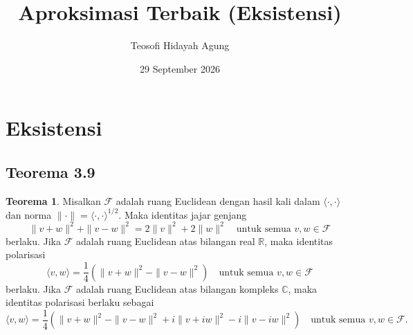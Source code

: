 \documentclass[aspectratio=169,11pt]{beamer}
\date{29 September 2026}
\title[Teori Aproksimasi]{Aproksimasi Terbaik (Eksistensi)}
\author[Tetew]{Teosofi Hidayah Agung}
\institute[Matematika ITS]{Matematika ITS}
\theoremstyle{definition}
\newtheorem{teorema}{Teorema}
\newcommand{\R}{\mathbb{R}}
\newcommand{\C}{\mathbb{C}}
\begin{document}
\begin{frame}
  \titlepage
\end{frame}

\section{Eksistensi}
\subsection{Teorema 3.9}

\begin{frame}{\insertsection}{\insertsubsection}
  \setcounter{teorema}{8}
  \begin{teorema}
    Misalkan $\mathcal{F}$ adalah ruang Euclidean dengan hasil kali dalam $\langle \cdot, \cdot \rangle$ dan norma $\| \cdot \| = \langle \cdot, \cdot \rangle^{1/2}$. Maka identitas jajar genjang
    \begin{equation}
      \|v+w\|^2 + \|v-w\|^2 = 2\|v\|^2 + 2\|w\|^2 \quad \text{untuk semua } v,w \in \mathcal{F} \label{eq:3.1}
    \end{equation}
    berlaku. Jika $\mathcal{F}$ adalah ruang Euclidean atas bilangan real $\R$, maka identitas polarisasi
    \begin{equation}
      \langle v,w \rangle = \frac{1}{4}(\|v+w\|^2 - \|v-w\|^2) \quad \text{untuk semua } v,w \in \mathcal{F} \label{eq:3.2}
    \end{equation}
    berlaku. Jika $\mathcal{F}$ adalah ruang Euclidean atas bilangan kompleks $\C$, maka identitas polarisasi berlaku sebagai
    \begin{equation}
      \langle v,w \rangle = \frac{1}{4}(\|v+w\|^2 - \|v-w\|^2 + i\|v+iw\|^2 - i\|v-iw\|^2)\quad \text{untuk semua } v,w \in \mathcal{F}. \label{eq:3.3}
    \end{equation}
  \end{teorema}
\end{frame}
\end{document}
